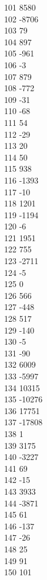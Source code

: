 { 101	8580 \\
 102	-8706 \\
 103	79 \\
 104	897 \\
 105	-961 \\
 106	-3 \\
 107	879 \\
 108	-772 \\
 109	-31 \\
 110	-68 \\
 111	54 \\
 112	-29 \\
 113	20 \\
 114	50 \\
 115	938 \\
 116	-1393 \\
 117	-10 \\
 118	1201 \\
 119	-1194 \\
 120	-6 \\
 121	1951 \\
 122	755 \\
 123	-2711 \\
 124	-5 \\
 125	0 \\
 126	566 \\
 127	-448 \\
 128	517 \\
 129	-140 \\
 130	-5 \\
 131	-90 \\
 132	6009 \\
 133	-5997 \\
 134	10315 \\
 135	-10276 \\
 136	17751 \\
 137	-17808 \\
 138	1 \\
 139	3175 \\
 140	-3227 \\
 141	69 \\
 142	-15 \\
 143	3933 \\
 144	-3871 \\
 145	61 \\
 146	-137 \\
 147	-26 \\
 148	25 \\
 149	91 \\
 150	101 \\
}
